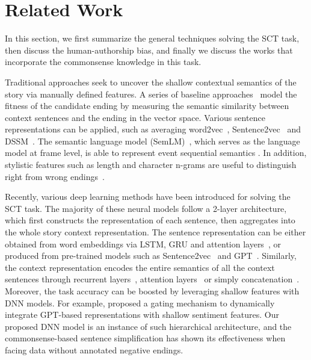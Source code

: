 \section{Related Work}
\label{sec:related}

In this section,
we first summarize the general techniques solving the SCT task,
then discuss the human-authorship bias,
and finally we discuss the works that incorporate the commonsense knowledge 
in this task.

Traditional approaches seek to uncover the shallow contextual semantics
of the story via manually defined features. A series of baseline
approaches~\cite{mihaylov2017story,mostafazadeh2016story}
model the fitness of the candidate ending
by measuring the semantic similarity between context sentences 
and the ending in the vector space.
Various sentence representations can be applied,
such as averaging word2vec~\cite{mikolov2013distributed},
Sentence2vec~\cite{kiros2015skip} and DSSM~\cite{huang2013learning}.
The semantic language model (SemLM)~\cite{peng2016two},
which serves as the language model at frame level,
is able to represent event sequential semantics
\cite{li2018multi,chaturvedi2017story}.
In addition, stylistic features such as length and
character n-grams are useful to distinguish
right from wrong endings~\cite{schwartz2017story}.

Recently, various deep learning methods have been introduced for
solving the SCT task.
The majority of these neural models follow a 2-layer architecture,
which first constructs the representation of each sentence,
then aggregates into the whole story context representation.
The sentence representation can be either obtained from word embeddings
via LSTM, GRU and attention layers~\cite{wang2017conditional,zhou2019story},
or produced from pre-trained models such as
Sentence2vec~\cite{roemmele2017rnn,srinivasan2018simple} and
GPT~\cite{radford2018improving,chen2018incorporating}.
Similarly, the context representation encodes the entire semantics
of all the context sentences through recurrent layers~\cite{cai2017pay},
attention layers~\cite{li2018multi}
or simply concatenation~\cite{bugert2017lsdsem}.
Moreover, the task accuracy can be boosted by leveraging shallow features with DNN models.
For example,  proposed a gating mechanism to
dynamically integrate GPT-based representations with shallow sentiment 
features.  Our proposed DNN model is an instance of such 
hierarchical architecture, and the commonsense-based sentence simplification 
has shown its effectiveness when facing data without annotated 
negative endings.

